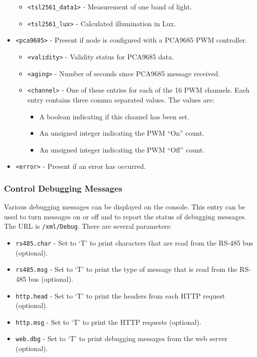 \documentclass[10pt, openany, draft]{article}
\begin{document}
\begin{itemize}
\begin{itemize}
    \item \texttt{<tsl2561\_data1>} - Measurement of one band of light.
    \item \texttt{<tsl2561\_lux>} - Calculated illumination in Lux.
  \end{itemize}
  \item \texttt{<pca9685>} - Present if node is configured with a PCA9685 PWM controller.
  \begin{itemize}
    \item \texttt{<validity>} - Validity status for PCA9685 data.
    \item \texttt{<aging>} - Number of seconds since PCA9685 message received.
    \item \texttt{<channel>} - One of these entries for each of the 16 PWM channels.  Each entry contains three comma separated values.  The values are:
    \begin{itemize}
      \item A boolean indicating if this channel has been set.
      \item An unsigned integer indicating the PWM ``On'' count.
      \item An unsigned integer indicating the PWM ``Off'' count.
    \end{itemize}
  \end{itemize}
  \item \texttt{<error>} - Present if an error has occurred.
\end{itemize}

\subsubsection{Control Debugging Messages}
Various debugging messages can be displayed on the console.  This entry can be used to turn messages on or off and to report the status of debugging messages.  The URL is \texttt{/xml/Debug}.  There are several parameters:
\begin{itemize}
  \item \texttt{rs485.char} - Set to `T' to print characters that are read from the RS-485 bus (optional).
  \item \texttt{rs485.msg} - Set to `T' to print the type of message that is read from the RS-485 bus (optional).
  \item \texttt{http.head} - Set to `T' to print the headers from each HTTP request (optional).
  \item \texttt{http.msg} - Set to `T' to print the HTTP requests (optional).
  \item \texttt{web.dbg} - Set to `T' to print debugging messages from the web server (optional).
\end{itemize}
\end{document}
